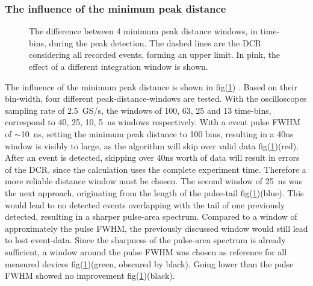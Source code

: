 \documentclass[12pt,article,type=msc,colorback,accentcolor=tud9c]{tudthesis}
\begin{document}
\subsubsection{The influence of the minimum peak distance}
\label{subsec:subsec_mpd}
\begin{figure}[h]
\begin{centering}
\caption[MPD parameter challenges and the integration window]{The difference between 4 minimum peak distance windows, in time-bins, during the peak detection. The dashed lines are the DCR considering all recorded events, forming an upper limit. In pink, the effect of a different integration window is shown.}
\label{fig:MPD_plot}
\end{centering}
\end{figure}
The influence of the minimum peak distance is shown in fig(\ref{fig:MPD_plot}) . Based on their bin-width, four different peak-distance-windows are tested. With the oscilloscopes sampling rate of 2.5~GS/s, the windows of 100, 63, 25 and 13 time-bins, correspond to 40, 25, 10, 5~ns windows respectively. With a event pulse FWHM of $\sim$10~ns, setting the minimum peak distance to 100 bins, resulting in a 40ns window is visibly to large, as the algorithm will skip over valid data fig(\ref{fig:MPD_plot})(red). After an event is detected, skipping over 40ns worth of data will result in errors of the DCR, since the calculation uses the complete experiment time. Therefore a more reliable distance window must be chosen. The second window of 25~ns was the next approach, originating from the length of the pulse-tail fig(\ref{fig:MPD_plot})(blue). This would lead to no detected events overlapping with the tail of one previously detected, resulting in a sharper pulse-area spectrum. Compared to a window of approximately the pulse FWHM, the previously discussed window would still lead to lost event-data. Since the sharpness of the pulse-area spectrum is already sufficient, a window around the pulse FWHM was chosen as reference for all measured devices fig(\ref{fig:MPD_plot})(green, obscured by black). Going lower than the pulse FWHM showed no improvement fig(\ref{fig:MPD_plot})(black). 
\end{document}
